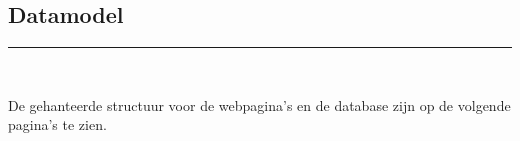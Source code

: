 \documentclass[a4paper,12pt]{article}
\newcommand{\HRule}{\rule{\linewidth}{0.5mm}}
\begin{document}
\begin{center}
\section[Datamodel]{Datamodel}
\HRule \\[0.5cm]
\end{center}

De gehanteerde structuur voor de webpagina's en de database zijn op de volgende pagina's te zien.
 
 
\end{document}
